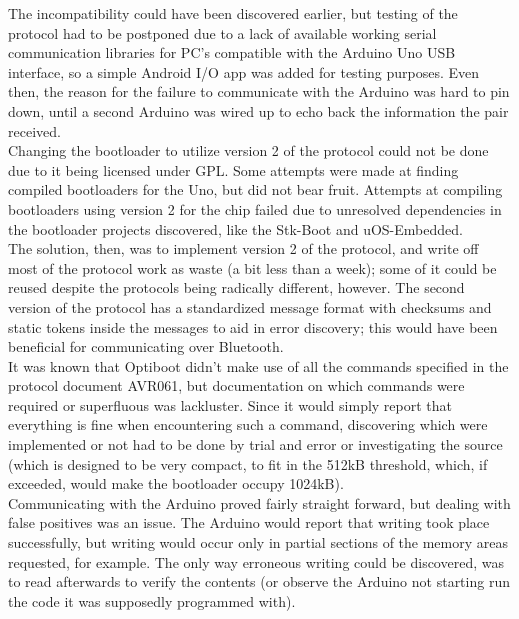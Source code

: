 	The incompatibility could have been discovered earlier, but testing of the protocol had to be postponed due to a lack of available working serial communication libraries for PC's compatible with the Arduino Uno USB interface, so a simple Android I/O app was added for testing purposes. Even then, the reason for the failure to communicate with the Arduino was hard to pin down, until a second Arduino was wired up to echo back the information the pair received.\\

	Changing the bootloader to utilize version 2 of the protocol could not be done due to it being licensed under GPL. Some attempts were made at finding compiled bootloaders for the Uno, but did not bear fruit. Attempts at compiling bootloaders using version 2 for the chip failed due to unresolved dependencies in the bootloader projects discovered, like the Stk-Boot\cite{StkBoot} and uOS-Embedded\cite{uOS-Embedded}.\\

	The solution, then, was to implement version 2 of the protocol, and write off most of the protocol work as waste (a bit less than a week); some of it could be reused despite the protocols being radically different, however. The second version of the protocol has a standardized message format with checksums and static tokens inside the messages to aid in error discovery; this would have been beneficial for communicating over Bluetooth.\\

	It was known that Optiboot didn't make use of all the commands specified in the protocol document AVR061\cite{AVR061}, but documentation on which commands were required or superfluous was lackluster. Since it would simply report that everything is fine when encountering such a command, discovering which were implemented or not had to be done by trial and error or investigating the source (which is designed to be very compact, to fit in the 512kB threshold, which, if exceeded, would make the bootloader occupy 1024kB).\\

	Communicating with the Arduino proved fairly straight forward, but dealing with false positives was an issue.
	The Arduino would report that writing took place successfully, but writing would occur only in partial sections of the memory areas requested, for example. The only way erroneous writing could be discovered, was to read afterwards to verify the contents (or observe the Arduino not starting run the code it was supposedly programmed with).\\

